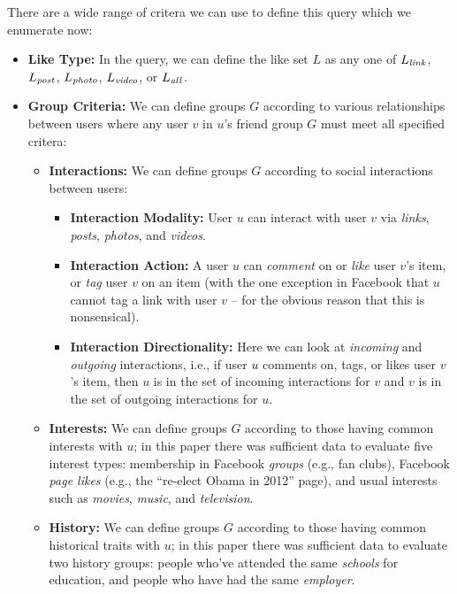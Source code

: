 There are a wide range of critera we can use to define this
query which we enumerate now:
\begin{itemize}
\item \textbf{Like Type:} In the query, we can define the like
set $L$ as any one of $L_{\mathit{link}}$, $L_{\mathit{post}}$, $L_{\mathit{photo}}$, $L_{\mathit{video}}$,
or $L_{\mathit{all}}$.
\item \textbf{Group Criteria:}  We can define 
    groups $G$ according to various relationships between users where
    any user $v$ in $u$'s friend group $G$ must meet all specified
    critera:
  \begin{itemize}
    \item \textbf{Interactions:} We can define 
    groups $G$ according to social interactions between users:
      \begin{itemize}
      \item \textbf{Interaction Modality:} User $u$ can interact with
       user $v$ via \textit{links}, \textit{posts}, 
       \textit{photos}, and \textit{videos}.
      \item \textbf{Interaction Action:} A user $u$ can
      \textit{comment} on or \textit{like} user $v$'s item,
      or \textit{tag} user $v$ on an item 
      (with the one exception in Facebook that $u$ cannot tag
      a link with user $v$ -- for the obvious reason that this is
      nonsensical).
      \item \textbf{Interaction Directionality:} Here we can look
      at \textit{incoming} and \textit{outgoing} interactions, i.e.,
      if user $u$ comments on, tags, or likes user $v$'s item,
      then $u$ is in the set of incoming interactions for $v$
      and $v$ is in the set of outgoing interactions for $u$.
    \end{itemize}
    \item \textbf{Interests:} We can define groups $G$ according to
      those having common interests with $u$; in this paper there was
      sufficient data to evaluate five interest types: membership in
      Facebook \textit{groups} (e.g., fan clubs), Facebook
      \textit{page likes} (e.g., the ``re-elect Obama in 2012'' page),
      and usual interests such as \textit{movies}, \textit{music}, and
      \textit{television}.
    \item \textbf{History:} We can define groups $G$ according to
      those having common historical traits with $u$; in this paper
      there was sufficient data to evaluate two history groups:
      people who've attended the same \textit{schools} for education,
      and people who have had the same \textit{employer}.

\end{itemize}
\end{itemize}
